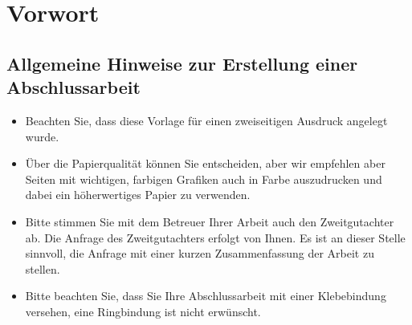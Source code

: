 %
\chapter*{Vorwort}
\label{chap:preface}

\section*{Allgemeine Hinweise zur Erstellung einer Abschlussarbeit}

\begin{itemize}
	\item Beachten Sie, dass diese Vorlage für einen zweiseitigen Ausdruck angelegt wurde.
	\item Über die Papierqualität können Sie entscheiden, aber wir empfehlen aber Seiten mit wichtigen, farbigen Grafiken auch in Farbe auszudrucken und dabei ein höherwertiges Papier zu verwenden.
	\item Bitte stimmen Sie mit dem Betreuer Ihrer Arbeit auch den Zweitgutachter ab. Die Anfrage des Zweitgutachters erfolgt von Ihnen. Es ist an dieser Stelle sinnvoll, die Anfrage mit einer kurzen Zusammenfassung der Arbeit zu stellen.
	\item Bitte beachten Sie, dass Sie Ihre Abschlussarbeit mit einer Klebebindung versehen, eine Ringbindung ist nicht erwünscht.
\end{itemize}
